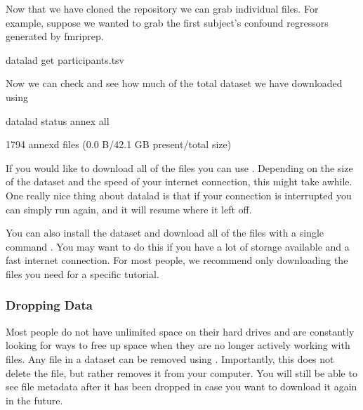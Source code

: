 \documentclass[letterpaper,10pt,english]{sphinxmanual}
\begin{document}
Now that we have cloned the repository we can grab individual files. For example, suppose we wanted to grab the first subject’s confound regressors generated by fmriprep.

\begin{sphinxVerbatim}[commandchars=\\\{\}]
datalad get participants.tsv
\end{sphinxVerbatim}

\begin{sphinxVerbatim}[commandchars=\\\{\}]

\end{sphinxVerbatim}

Now we can check and see how much of the total dataset we have downloaded using 

\begin{sphinxVerbatim}[commandchars=\\\{\}]
datalad status \PYGZhy{}\PYGZhy{}annex all
\end{sphinxVerbatim}

\begin{sphinxVerbatim}[commandchars=\\\{\}]
1794 annex\PYGZsq{}d files (0.0 B/42.1 GB present/total size)

\end{sphinxVerbatim}

If you would like to download all of the files you can use . Depending on the size of the dataset and the speed of your internet connection, this might take awhile. One really nice thing about datalad is that if your connection is interrupted you can simply run  again, and it will resume where it left off.

You can also install the dataset and download all of the files with a single command . You may want to do this if you have a lot of storage available and a fast internet connection. For most people, we recommend only downloading the files you need for a specific tutorial.


\subsubsection{Dropping Data}
\label{\detokenize{content/Download_Data:dropping-data}}
Most people do not have unlimited space on their hard drives and are constantly looking for ways to free up space when they are no longer actively working with files. Any file in a dataset can be removed using . Importantly, this does not delete the file, but rather removes it from your computer. You will still be able to see file metadata after it has been dropped in case you want to download it again in the future.
\end{document}
